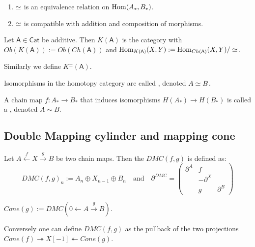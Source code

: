 \documentclass[fontsize=11pt,fleqn,a4paper]{scrartcl}
\begin{document}
\begin{lemma}
\begin{enumerate}
\item $\overset{}{\simeq}$ is an equivalence relation on $\operatorname{Hom}(A_\ast,B_\ast)$.
\item $\overset{}{\simeq}$ is compatible with addition and composition of morphisms.
\end{enumerate}
\end{lemma}

\begin{definition}
Let $\mathsf{A}\in\mathsf{Cat}$ be additive. Then $K(\mathsf{A})$ is the category with $Ob(K(\mathsf{A})) := Ob(Ch(\mathsf{A}))$ and $\operatorname{Hom}_{K(\mathsf{A})}(X,Y) := \operatorname{Hom}_{Ch(\mathsf{A})}(X,Y) / \overset{}{\simeq}$.

Similarly we define $K^\pm(\mathsf{A})$.
\end{definition}

\begin{definition}
Isomorphisms in the homotopy category are called , denoted $A\overset{}{\simeq} B$.

A chain map $f: A_\ast\to B_\ast$ that induces isomorphisms $H(A_\ast) \to H(B_\ast)$ is called a , denoted $A \sim B$.
\end{definition}

\subsection{Double Mapping cylinder and mapping cone}

\begin{definition}
Let $A\xleftarrow{f} X \xrightarrow{g} B$ be two chain maps. Then the  $DMC(f,g)$ is defined as:
\[DMC(f,g)_n := A_n \oplus X_{n-1} \oplus B_n \quad\text{and}\quad \partial^{DMC} = \begin{pmatrix} \partial^A & f & \\ & -\partial^X & \\ & g & \partial^B\end{pmatrix}\]
\end{definition}

\begin{definition}
$Cone(g) := DMC(0\leftarrow A \xrightarrow{g} B)$.
\end{definition}

\begin{remark}
Conversely one can define $DMC(f,g)$ as the pullback of the two projections $Cone(f) \twoheadrightarrow X[-1] \twoheadleftarrow Cone(g)$.
\end{remark}
\end{document}
